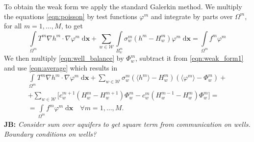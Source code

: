 \documentclass[preprint,12pt]{elsarticle}
\def\vc#1{\mathbf{\boldsymbol{#1}}}     %
\def\avg#1{\langle#1\rangle}
\newcommand{\dd}{\; \mathrm{d}}
\newcommand{\bx}{\vc{x}}
\newcommand{\noteJB}[1]{{\color{Blue} \textbf{JB: } \textit{#1}}}
\begin{document}
To obtain the weak form we apply the standard Galerkin method. We multiply the equations \eqref{eqn:poisson} 
by test functions $\varphi^m$ and integrate by parts over $\Omega^m$, for all $m=1,\ldots,M$, to get
\begin{equation} \label{eqn:weak_form1}
  \int \limits_{\Omega^m} T^m \nabla h^m \cdot \nabla \varphi^m \dd\bx
  + \sum \limits_{w\in \mathcal{W}} \int \limits_{B^m_w} \sigma^m_w (h^m - H_w^m) \varphi^m \dd\bx
  = \int \limits_{\Omega^m} f^m\varphi^m%
\end{equation}
We then multiply \eqref{eqn:well_balance} by $\Phi^m_w$, subtract it from \eqref{eqn:weak_form1} 
and use \eqref{eqn:average} which results in
\begin{multline} \label{eqn:weak_form}
  \int \limits_{\Omega^m} T^m \nabla h^m \cdot \nabla \varphi^m \dd\bx
        + \sum \limits_{w\in \mathcal{W}} \sigma^m_w\left( \avg{h^m}-H^m_w\right)
          \left(\avg{\varphi^m}-\Phi^m_w\right) + \\
          + \sum\limits_{w\in\mathcal{W}} \Big[
          c_w^{m+1}\left( H^m_w-H_w^{m+1}\right)\Phi^m_w - c^m_w\left( H^{m-1}_w-H^m_w \right)\Phi^m_w \Big]= \\
  =\int \limits_{\Omega^m} f^m\varphi^m \dd\bx \quad \forall m=1,\ldots,M.
\end{multline}
\noteJB{Consider sum over aquifers to get square term from communication on wells.
Boundary conditions on wells?}

\end{document}
